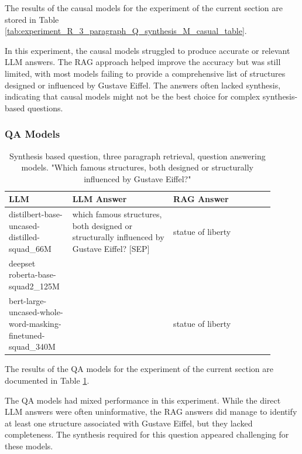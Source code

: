 \documentclass{wseas}
\begin{document}
The results of the causal models for the experiment of the current section
are stored in Table \ref{tab:experiment_R_3_paragraph_Q_synthesis_M_casual_table}.

In this experiment, the causal models struggled to produce accurate or
relevant LLM answers. The RAG approach helped improve the accuracy but
was still limited, with most models failing to provide a comprehensive
list of structures designed or influenced by Gustave Eiffel. The answers
often lacked synthesis, indicating that causal models might not be the
best choice for complex synthesis-based questions.


\subsubsection{QA Models}

\begin{table}[htbp]
  \centering
  \caption{Synthesis based question, three paragraph retrieval, question answering models. "Which famous structures, both designed or structurally influenced by Gustave Eiffel?"} %
  \label{tab:experiment_R_3_paragraph_Q_synthesis_M_QaModels_table}  %
  \begin{tabular}{|p{0.20\linewidth}|p{0.35\linewidth}|p{0.35\linewidth}|}
    \hline
    \textbf{LLM} & \textbf{LLM Answer} & \textbf{RAG Answer} \\
    \hline
    distilbert-base-uncased-distilled-squad\_66M & which famous structures, both designed or structurally influenced by Gustave Eiffel? {[}SEP{]} & statue of liberty \\
    \hline
    deepset roberta-base-squad2\_125M & & \\
    \hline
    bert-large-uncased-whole-word-masking-finetuned-squad\_340M & & statue of liberty \\
    \hline
  \end{tabular}
\end{table}

The results of the QA models for the experiment of the current section
are documented in Table \ref{tab:experiment_R_3_paragraph_Q_synthesis_M_QaModels_table}.

The QA models had mixed performance in this experiment. While the direct
LLM answers were often uninformative, the RAG answers did manage to
identify at least one structure associated with Gustave Eiffel, but they
lacked completeness. The synthesis required for this question appeared
challenging for these models.
\end{document}
